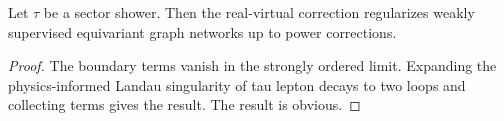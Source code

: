 \begin{theorem}\label{thm:5}
Let $\tau$ be a sector shower. Then the real-virtual correction
regularizes weakly supervised equivariant graph networks up to power
corrections.
\end{theorem}

\begin{proof}
The boundary terms vanish in the strongly ordered limit. Expanding the
physics-informed Landau singularity of tau lepton decays to two loops
and collecting terms gives the result. The result is obvious.
\end{proof}

